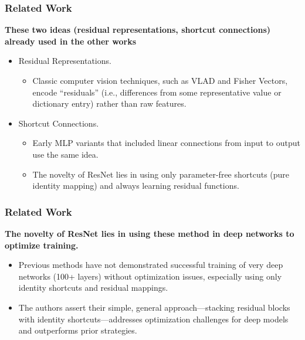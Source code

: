 \documentclass[
	11pt, %
]{beamer}
\begin{document}
\begin{frame}
	\frametitle{Related Work}

	\textbf{These two ideas (residual representations, shortcut connections) already used in the other works}
	\begin{itemize}
		\item Residual Representations.
		\begin{itemize}
			\item Classic computer vision techniques, such as VLAD and Fisher Vectors, encode “residuals” (i.e., differences from some representative value or dictionary entry) rather than raw features.
		\end{itemize}
		\item Shortcut Connections.
		\begin{itemize}
			\item Early MLP variants that included linear connections from input to output use the same idea.
			\item The novelty of ResNet lies in using only parameter-free shortcuts (pure identity mapping) and always learning residual functions.
		\end{itemize}
	\end{itemize}
\end{frame}

\begin{frame}
	\frametitle{Related Work}

	\textbf{The novelty of ResNet lies in using these method in deep networks to optimize training.}
	\begin{itemize}
		\item Previous methods have not demonstrated successful training of very deep networks (100+ layers) without optimization issues, especially using only identity shortcuts and residual mappings.
		\item The authors assert their simple, general approach—stacking residual blocks with identity shortcuts—addresses optimization challenges for deep models and outperforms prior strategies.
	\end{itemize}
\end{frame}
\end{document}

